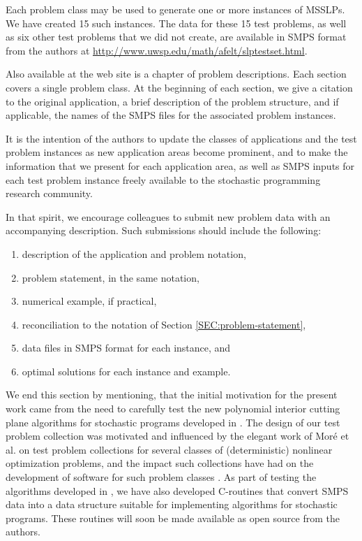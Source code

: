 Each problem class may be used to generate one or more instances of MSSLPs.  We
have created 15 such instances.  The data for these 15 test problems, as well
as six other test problems that we did not create, are available in SMPS format
\cite{SMPS87} from the authors at
\url{http://www.uwsp.edu/math/afelt/slptestset.html}.

Also available at the web site is a chapter of problem descriptions.  Each
section covers a single problem class.  At the beginning of each section, we
give a citation to the original application, a brief description of the problem
structure, and
if applicable,
the names of the SMPS files for the associated problem instances.%

It is the intention of the authors to update the classes of applications and
the test problem instances as new application areas become prominent, and to
make the information that we present for each application area, as well as SMPS
inputs for each test problem instance freely available to the stochastic
programming research community.

In that spirit, we encourage colleagues to submit new problem data
with an accompanying description.  Such submissions should include the
following:
\begin{enumerate}
\item description of the application and problem notation,
\item problem statement, in the same notation,
\item numerical example, if practical,
\item reconciliation to the notation of Section \ref{SEC:problem-statement},
\item data files in SMPS format for each instance, and
\item optimal solutions for each instance and example.
\end{enumerate}

We end this section by mentioning, that the initial motivation
for the present work came from the need to carefully test the
new polynomial interior cutting plane algorithms for
stochastic programs developed in \cite{ari96}. The
design of our test problem collection was motivated and influenced by
the elegant  work of Mor\'e et al. \cite{more90,more-averick91}
on test problem collections for several classes of (deterministic)
nonlinear optimization problems, and the impact such collections
have had on the development of software for such problem classes
\cite{more-toraldo91,more-lin99,more-benson01}. As part of testing
the algorithms developed in \cite{ari96}, we have
also developed C-routines that convert SMPS data into
a data structure suitable for implementing algorithms for
stochastic programs. 
These routines will soon be made available as open source
from the authors.

